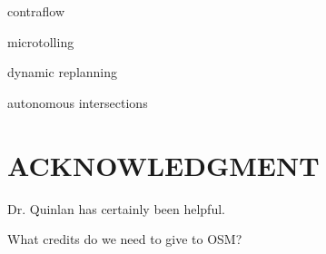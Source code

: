 \documentclass[letterpaper, 10 pt, conference]{ieeeconf}  %
\begin{document}
contraflow

microtolling

dynamic replanning

autonomous intersections

\addtolength{\textheight}{-12cm}  %


\section*{ACKNOWLEDGMENT}

Dr. Quinlan has certainly been helpful.

What credits do we need to give to OSM?








\end{document}
